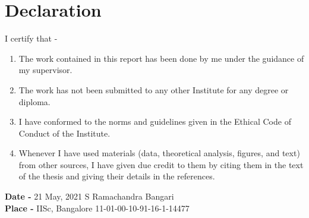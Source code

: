 \cleardoublepage
\chapter*{\centering Declaration}

I certify that - 
\begin{enumerate}[label=(\alph*)]
\item The work contained in this report has been done by me under the guidance of my supervisor.
\item The work has not been submitted to any other Institute for any degree or diploma.
\item I have conformed to the norms and guidelines given in the Ethical Code of Conduct of the Institute.
\item Whenever I have used materials (data, theoretical analysis, figures, and text) from other sources, I have given due credit to them by citing them in the text of the thesis and giving their details in the references.
\end{enumerate}
\vspace{6 cm}
\textbf{Date -} 21 May, 2021 \hfill S Ramachandra Bangari \\
\textbf{Place -} IISc, Bangalore \hfill 11-01-00-10-91-16-1-14477